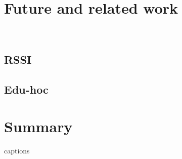 \documentclass[
  print, %
  Table,   %
  nolof,     %
  nolot,     %
           oneside
]{fithesis3}
\begin{document}
\chapter{Future and related work}\
  \section{RSSI}
  \section{Edu-hoc}
\chapter{Summary}




{\csname captions\languagename\endcsname %
\makeatletter %
  \thesis@selectLocale{\thesis@locale}\makeatother
\printbibliography[heading=bibintoc]} %

\appendix %
\end{document}
